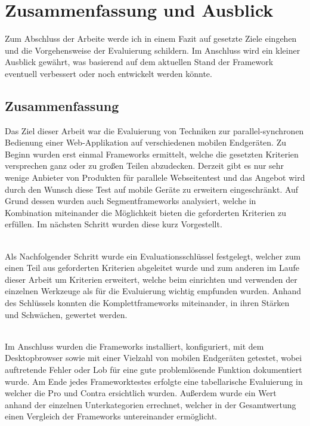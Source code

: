 \chapter{Zusammenfassung und Ausblick}
Zum Abschluss der Arbeite werde ich in einem Fazit auf gesetzte Ziele eingehen und die Vorgehensweise der Evaluierung schildern. Im Anschluss wird ein kleiner Ausblick gewährt, was basierend auf dem aktuellen Stand der Framework eventuell verbessert oder noch entwickelt werden könnte.

\section{Zusammenfassung}
Das Ziel dieser Arbeit war die Evaluierung von Techniken zur
parallel-synchronen Bedienung einer
Web-Applikation auf verschiedenen
mobilen Endgeräten. Zu Beginn wurden erst einmal Frameworks ermittelt, welche die gesetzten Kriterien versprechen ganz oder zu großen Teilen abzudecken. 
Derzeit gibt es nur sehr wenige Anbieter von Produkten für parallele Webseitentest und das Angebot wird durch den Wunsch diese Test auf mobile Geräte zu erweitern eingeschränkt. Auf Grund dessen wurden auch Segmentframeworks analysiert, welche in Kombination miteinander die Möglichkeit bieten die geforderten Kriterien zu erfüllen. Im nächsten Schritt wurden diese kurz Vorgestellt.

\\Als Nachfolgender Schritt wurde ein Evaluationsschlüssel festgelegt, welcher zum einen Teil aus geforderten Kriterien abgeleitet wurde und zum anderen im Laufe dieser Arbeit um Kriterien erweitert, welche beim einrichten und verwenden der einzelnen Werkzeuge als für die Evaluierung wichtig empfunden wurden. Anhand des Schlüssels konnten die Komplettframeworks miteinander, in ihren Stärken und Schwächen, gewertet werden.

\\Im Anschluss wurden die Frameworks installiert, konfiguriert, mit dem Desktopbrowser sowie mit einer Vielzahl von mobilen Endgeräten getestet, wobei auftretende Fehler oder Lob für eine gute problemlösende Funktion dokumentiert wurde. Am Ende jedes Frameworktestes erfolgte eine tabellarische Evaluierung in welcher die Pro und Contra ersichtlich wurden. Außerdem wurde ein Wert anhand der einzelnen Unterkategorien errechnet, welcher in der Gesamtwertung einen Vergleich der Frameworks untereinander ermöglicht.

